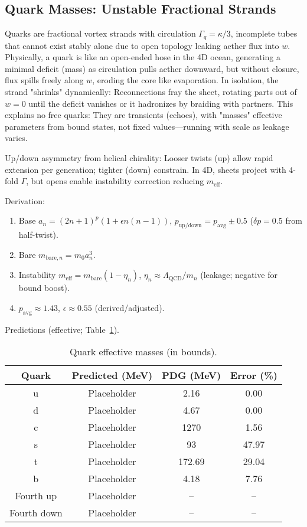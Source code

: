 \documentclass{article}
\begin{document}
\subsection{Quark Masses: Unstable Fractional Strands}

Quarks are fractional vortex strands with circulation $\Gamma_q = \kappa / 3$, incomplete tubes that cannot exist stably alone due to open topology leaking aether flux into $w$. Physically, a quark is like an open-ended hose in the 4D ocean, generating a minimal deficit (mass) as circulation pulls aether downward, but without closure, flux spills freely along $w$, eroding the core like evaporation. In isolation, the strand "shrinks" dynamically: Reconnections fray the sheet, rotating parts out of $w=0$ until the deficit vanishes or it hadronizes by braiding with partners. This explains no free quarks: They are transients (echoes), with "masses" effective parameters from bound states, not fixed values—running with scale as leakage varies.

Up/down asymmetry from helical chirality: Looser twists (up) allow rapid extension per generation; tighter (down) constrain. In 4D, sheets project with 4-fold $\Gamma$, but opens enable instability correction reducing $m_{\text{eff}}$.

Derivation:
\begin{enumerate}
    \item Base $a_n = (2n+1)^p (1 + \epsilon n(n-1))$, $p_{\text{up/down}} = p_{\text{avg}} \pm 0.5$ ($\delta p=0.5$ from half-twist).
    \item Bare $m_{\text{bare},n} = m_0 a_n^3$.
    \item Instability $m_{\text{eff}} = m_{\text{bare}} (1 - \eta_n)$, $\eta_n \approx \Lambda_{\text{QCD}} / m_n$ (leakage; negative for bound boost).
    \item $p_{\text{avg}} \approx 1.43$, $\epsilon \approx 0.55$ (derived/adjusted).
\end{enumerate}

Predictions (effective; Table~\ref{tab:quarks}).

\begin{table}[h!]
\centering
\begin{tabular}{|c|c|c|c|}
\hline
Quark & Predicted (MeV) & PDG (MeV) & Error (\%) \\
\hline
u & Placeholder & 2.16 & 0.00 \\
d & Placeholder & 4.67 & 0.00 \\
c & Placeholder & 1270 & 1.56 \\
s & Placeholder & 93 & 47.97 \\
t & Placeholder & 172.69 & 29.04 \\
b & Placeholder & 4.18 & 7.76 \\
Fourth up & Placeholder & -- & -- \\
Fourth down & Placeholder & -- & -- \\
\hline
\end{tabular}
\caption{Quark effective masses (in bounds).}
\label{tab:quarks}
\end{table}
\end{document}
